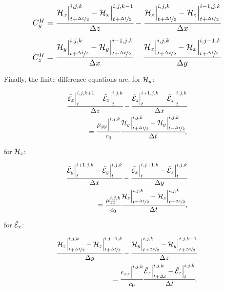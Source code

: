\begin{align}
    \resizebox{.8\hsize}{!}{$
        \CHy = \cfrac{\Hht_x\Big|^{i,j,k}_{t+\nicefrac{\dt}{2}}-\Hht_x\Big|^{i,j,k-1}_{t+\nicefrac{\dt}{2}}}{\dz} - \cfrac{\Hht_z\Big|^{i,j,k}_{t+\nicefrac{\dt}{2}}-\Hht_z\Big|^{i-1,j,k}_{t+\nicefrac{\dt}{2}}}{\dx}
        \label{eq:CHy}
    $}
\end{align}


\begin{align}
    \resizebox{.8\hsize}{!}{$
        \CHz = \cfrac{\Hht_y\Big|^{i,j,k}_{t+\nicefrac{\dt}{2}}-\Hht_y\Big|^{i-1,j,k}_{t+\nicefrac{\dt}{2}}}{\dx} - \cfrac{\Hht_x\Big|^{i,j,k}_{t+\nicefrac{\dt}{2}}-\Hht_x\Big|^{i,j-1,k}_{t+\nicefrac{\dt}{2}}}{\dy}
        \label{eq:CHz}
    $}
\end{align}


Finally, the finite-difference equations are, for $\mathcal{H}_y$:

\begin{align}
    \cfrac{\tilde{\mathcal{E}}_x\Big|^{i,j,k+1}_{t}-\tilde{\mathcal{E}}_x\Big|^{i,j,k}_{t}}{\Delta z} - \cfrac{\tilde{\mathcal{E}}_z\Big|^{i+1,j,k}_{t}-\tilde{\mathcal{E}}_z\Big|^{i,j,k}_{t}}{\Delta x} \nonumber \\ 
    =\cfrac{\mu_{yy}\Big|^{i,j,k}}{c_0}\cfrac{\mathcal{H}_y\Big|^{i,j,k}_{t+\nicefrac{\Delta t}{2}} - \mathcal{H}_y\Big|^{i,j,k}_{t-\nicefrac{\Delta t}{2}}}{\Delta t},
    \label{eq:fd_hy}
\end{align}

for $\mathcal{H}_z$:

\begin{align}
    \cfrac{\tilde{\mathcal{E}}_y\Big|^{i+1,j,k}_{t}-\tilde{\mathcal{E}}_y\Big|^{i,j,k}_{t}}{\Delta x} - \cfrac{\tilde{\mathcal{E}}_x\Big|^{i,j+1,k}_{t}-\tilde{\mathcal{E}}_x\Big|^{i,j,k}_{t}}{\Delta y} \nonumber \\
    =\cfrac{\mu_{zz}^{i,j,k}}{c_0}\cfrac{\mathcal{H}_z\Big|^{i,j,k}_{t+\nicefrac{\Delta t}{2}} - \mathcal{H}_z\Big|^{i,j,k}_{t-\nicefrac{\Delta t}{2}}}{\Delta t},
    \label{eq:fd_hz}
\end{align}

for $\tilde{\mathcal{E}}_x$:

\begin{small}
    \begin{align}
        \cfrac{\mathcal{H}_z\Big|^{i,j,k}_{t+\nicefrac{\Delta t}{2}}-\mathcal{H}_z\Big|^{i,j-1,k}_{t+\nicefrac{\Delta t}{2}}}{\Delta y} - \cfrac{\mathcal{H}_y\Big|^{i,j,k}_{t+\nicefrac{\Delta t}{2}}-\mathcal{H}_y\Big|^{i,j,k-1}_{t+\nicefrac{\Delta t}{2}}}{\Delta z} \nonumber\\
        =
        \cfrac{\epsilon_{xx}\Big|^{i,j,k}}{c_0}\cfrac{\tilde{\mathcal{E}}_x\Big|^{i,j,k}_{t+\Delta t}-\tilde{\mathcal{E}}_x\Big|^{i,j,k}_{t}}{\Delta t},
        \label{eq:fd_ex}
    \end{align}  
\end{small}


